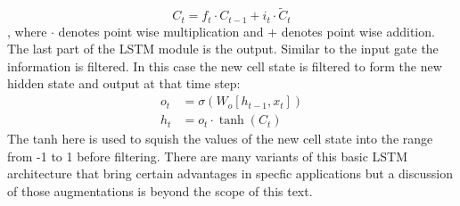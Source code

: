 \documentclass{article}
\begin{document}
\[
C_t = f_t\cdot C_{t-1}+i_t\cdot \tilde{C}_t
\]
, where \(\cdot\) denotes point wise multiplication and \(+\) denotes point wise addition. The last part of the LSTM module is the output. Similar to the input gate the information is filtered. In this case the new cell state is filtered to form the new hidden state and output at that time step:
\[
\begin{split}
o_t &= \sigma(W_o[h_{t-1}, x_t])\\
h_t &= o_t\cdot\tanh(C_t)
\end{split}
\]
The tanh here is used to squish the values of the new cell state into the range from -1 to 1 before filtering. There are many variants of this basic LSTM architecture that bring certain advantages in specfic applications but a discussion of those augmentations is beyond the scope of this text.
\end{document}
